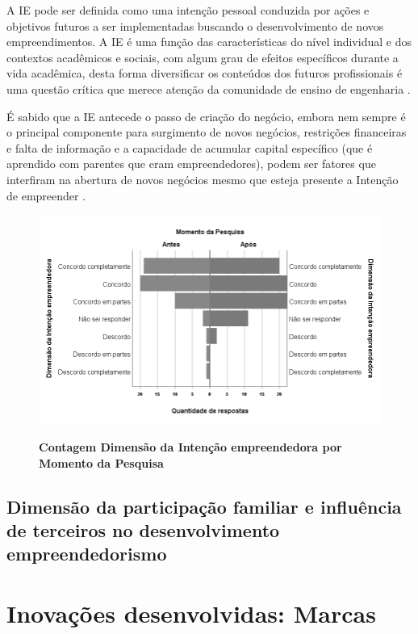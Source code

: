 A IE pode ser definida como uma intenção pessoal conduzida por ações e objetivos futuros a ser implementadas buscando o desenvolvimento de novos empreendimentos. A IE é uma função das características do nível individual e dos contextos acadêmicos e sociais, com algum grau de efeitos específicos durante a vida acadêmica, desta forma diversificar os conteúdos dos futuros profissionais é uma questão crítica que merece atenção da comunidade de ensino de engenharia \cite{gilmartin_entrepreneurial_2019}.

É sabido que a IE antecede o passo de criação do negócio, embora nem sempre é o principal componente para surgimento de novos negócios, restrições financeiras e falta de informação e a capacidade de acumular capital específico (que é aprendido com parentes que eram empreendedores), podem ser fatores que interfiram na abertura de novos negócios mesmo que esteja presente a Intenção de empreender \cite{auguste_what_2016}.



\begin{figure}[H]
\centering
\caption{\textbf{Contagem Dimensão da Intenção empreendedora  por Momento da Pesquisa}}
\includegraphics[scale=0.6]{Imagens/intencao_empreendedora.png}
\label{figura_45}
\end{figure}


\subsection{Dimensão da participação familiar e influência de terceiros no desenvolvimento empreendedorismo}



\section{Inovações desenvolvidas: Marcas}
\label{inovacoes}

